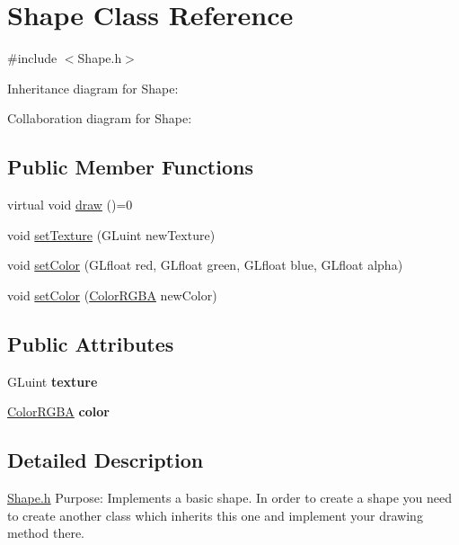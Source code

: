 \hypertarget{class_shape}{}\section{Shape Class Reference}
\label{class_shape}


{\ttfamily \#include $<$Shape.\+h$>$}



Inheritance diagram for Shape\+:


Collaboration diagram for Shape\+:
\subsection*{Public Member Functions}
\begin{DoxyCompactItemize}
\item 
virtual void \hyperlink{class_shape_afacc5aad8e37308c3ce8fef768199b05}{draw} ()=0
\item 
void \hyperlink{class_shape_ab8b36de701a4e376c4baaf4e46a6612b}{set\+Texture} (G\+Luint new\+Texture)
\item 
void \hyperlink{class_shape_ad2dd6757c54649671a5b8bc2d278eaf6}{set\+Color} (G\+Lfloat red, G\+Lfloat green, G\+Lfloat blue, G\+Lfloat alpha)
\item 
void \hyperlink{class_shape_a8949a1a808e0699cbafa307919149af4}{set\+Color} (\hyperlink{class_color_r_g_b_a}{Color\+R\+G\+B\+A} new\+Color)
\end{DoxyCompactItemize}
\subsection*{Public Attributes}
\begin{DoxyCompactItemize}
\item 
\hypertarget{class_shape_a32db6fa179d8703aa4f59659602f3dd3}{}G\+Luint {\bfseries texture}\label{class_shape_a32db6fa179d8703aa4f59659602f3dd3}

\item 
\hypertarget{class_shape_a091bbed77b00d7a4ec8e777e2162254a}{}\hyperlink{class_color_r_g_b_a}{Color\+R\+G\+B\+A} {\bfseries color}\label{class_shape_a091bbed77b00d7a4ec8e777e2162254a}

\end{DoxyCompactItemize}


\subsection{Detailed Description}
\hyperlink{_shape_8h_source}{Shape.\+h} Purpose\+: Implements a basic shape. In order to create a shape you need to create another class which inherits this one and implement your drawing method there.

